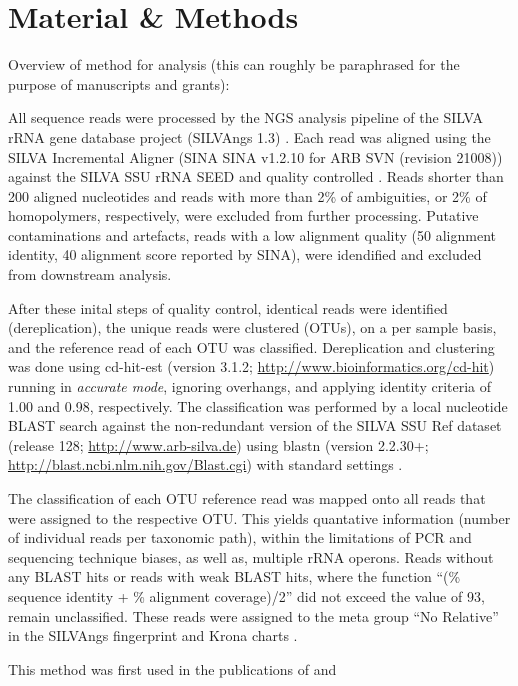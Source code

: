 \section{Material \& Methods}
Overview of method for analysis (this can roughly be paraphrased for the
purpose of manuscripts and grants):
\vspace{1.5cm}

\noindent
All sequence reads were processed by the NGS analysis pipeline of the SILVA
rRNA gene database project (SILVAngs 1.3) \citep{quast2013}.
Each read was aligned using the SILVA Incremental Aligner (SINA SINA v1.2.10 for ARB SVN (revision 21008))
\citep{pruesse2012} against the SILVA SSU rRNA SEED and quality
controlled \citep{quast2013}. 
Reads shorter than 200 aligned nucleotides and reads with more
than 2\% of ambiguities, or 2\% of homopolymers,
respectively, were excluded from further processing.
Putative contaminations and artefacts, reads with a low alignment quality
(50  alignment identity, 40 alignment score reported by
SINA), were idendified and excluded from downstream analysis.

After these inital steps of quality control, identical reads were
identified (dereplication), the unique reads were clustered (OTUs), 
on a per sample basis, and the reference read of each OTU was classified.
Dereplication and clustering was done using cd-hit-est (version
3.1.2; \url{http://www.bioinformatics.org/cd-hit}) \citep{li2006}
running in \emph{accurate mode}, ignoring overhangs, and applying identity
criteria of 1.00 and 0.98, respectively. 
The classification was performed by a local nucleotide BLAST search against
the non-redundant version of the SILVA SSU Ref dataset (release
128; \url{http://www.arb-silva.de}) using blastn (version
2.2.30+; \url{http://blast.ncbi.nlm.nih.gov/Blast.cgi}) with standard
settings \citep{camacho2009}.

The classification of each OTU reference read was mapped onto all reads
that were assigned to the respective OTU.
This yields quantative information (number of individual reads per taxonomic
path), within the limitations of PCR and sequencing technique biases, as 
well as, multiple rRNA operons.
Reads without any BLAST hits or reads with weak BLAST hits, where the
function ``(\% sequence identity + \% alignment coverage)/2'' did not exceed
the value of 93, remain unclassified.
These reads were assigned to the meta group ``No Relative'' in the
SILVAngs fingerprint and Krona charts \citep{ondov2011}.

This method was first used in the publications of \cite{klindworth2013} and
\cite{ionescu2012} 

